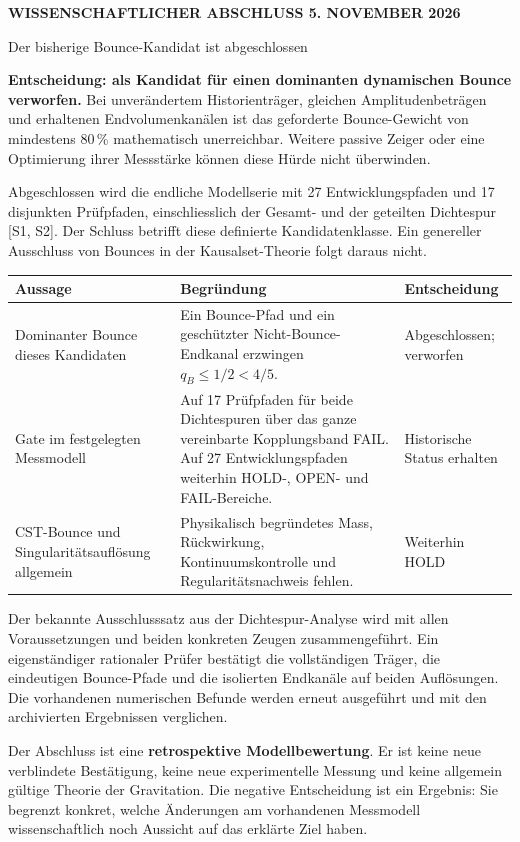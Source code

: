 \documentclass[11pt,a4paper]{article}
\newcommand{\kicker}[1]{{\sffamily\bfseries\small\color{teal}#1}\par}
\newcommand{\tit}[1]{{\sffamily\bfseries\LARGE\raggedright #1\par}\vspace{3pt}}
\newcommand{\sect}[1]{\par\vspace{3pt}{\sffamily\bfseries\large #1}\par}
\newcommand{\note}[1]{\par\colorbox{wash}{\parbox{\dimexpr\linewidth-2\fboxsep}{\vspace{4pt}#1\vspace{4pt}}}\par}
\begin{document}
\kicker{WISSENSCHAFTLICHER ABSCHLUSS \hfill 5. NOVEMBER 2026}
\tit{Der bisherige Bounce-Kandidat ist abgeschlossen}
\note{\textbf{Entscheidung: als Kandidat für einen dominanten dynamischen Bounce verworfen.} Bei unverändertem Historienträger, gleichen Amplitudenbeträgen und erhaltenen Endvolumenkanälen ist das geforderte Bounce-Gewicht von mindestens 80\,\% mathematisch unerreichbar. Weitere passive Zeiger oder eine Optimierung ihrer Messstärke können diese Hürde nicht überwinden.}

Abgeschlossen wird die endliche Modellserie mit 27 Entwicklungspfaden und 17 disjunkten Prüfpfaden, einschliesslich der Gesamt- und der geteilten Dichtespur [S1, S2]. Der Schluss betrifft diese definierte Kandidatenklasse. Ein genereller Ausschluss von Bounces in der Kausalset-Theorie folgt daraus nicht.

\sect{Drei Ebenen des Ergebnisses}
\par\begin{tabularx}{\linewidth}{@{}p{35mm}Yp{31mm}@{}}\toprule
\textbf{Aussage} & \textbf{Begründung} & \textbf{Entscheidung}\\\midrule
Dominanter Bounce dieses Kandidaten & Ein Bounce-Pfad und ein geschützter Nicht-Bounce-Endkanal erzwingen $q_B\le 1/2<4/5$. & Abgeschlossen; verworfen\\
Gate im festgelegten Messmodell & Auf 17 Prüfpfaden für beide Dichtespuren über das ganze vereinbarte Kopplungsband FAIL. Auf 27 Entwicklungspfaden weiterhin HOLD-, OPEN- und FAIL-Bereiche. & Historische Status erhalten\\
CST-Bounce und Singularitätsauflösung allgemein & Physikalisch begründetes Mass, Rückwirkung, Kontinuumskontrolle und Regularitätsnachweis fehlen. & Weiterhin HOLD\\\bottomrule
\end{tabularx}\par\vspace{3pt}

\sect{Was dieser Abschluss neu leistet}
Der bekannte Ausschlusssatz aus der Dichtespur-Analyse wird mit allen Voraussetzungen und beiden konkreten Zeugen zusammengeführt. Ein eigenständiger rationaler Prüfer bestätigt die vollständigen Träger, die eindeutigen Bounce-Pfade und die isolierten Endkanäle auf beiden Auflösungen. Die vorhandenen numerischen Befunde werden erneut ausgeführt und mit den archivierten Ergebnissen verglichen.

Der Abschluss ist eine \textbf{retrospektive Modellbewertung}. Er ist keine neue verblindete Bestätigung, keine neue experimentelle Messung und keine allgemein gültige Theorie der Gravitation. Die negative Entscheidung ist ein Ergebnis: Sie begrenzt konkret, welche Änderungen am vorhandenen Messmodell wissenschaftlich noch Aussicht auf das erklärte Ziel haben.
\end{document}

